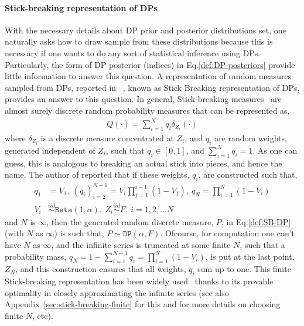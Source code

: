 \documentclass[10pt]{article}
\newcommand{\DP}{\texttt{DP}}
\begin{document}
\paragraph{Stick-breaking representation of DPs} With the necessary details about DP prior and posterior distributions set, one naturally asks how to draw sample from these distributions because this is necessary if one wants to do any sort of statistical inference using DPs. Particularly, the form of DP posterior (indices) in Eq.\ref{def:DP-posteriors} provide little information to answer this question. A representation of random measures sampled from DPs, reported in ~\citep{sethuraman1994constructive}, known as Stick Breaking representation of DPs, provides an answer to this question. 
In general, Stick-breaking measures~\citep{ishwaran2001gibbs} are almost surely discrete random probability measures that can be represented as,
\begin{align}\label{def:Stick-Breaking-priors}
{Q}(\cdot) = \sum_{i=1}^{N}q_{i}\delta_{Z_{i}}(\cdot)
\end{align}
where $\delta_{Z_{i}}$ is a discrete measure concentrated at $Z_{i}$, and $q_{i}$  are random weights, generated independent of $Z_{i}$, such that $q_{i}\in [0,1]$, and $\sum_{i=1}^{N}q_{i} = 1$. As one can guess, this is analogous to breaking an actual stick into pieces, and hence the name. The author of \cite{sethuraman1994constructive} reported  that if these weights, $q_{i}$, are constructed  such that,
\begin{align} 
\label{def:SB-DP}
q_{1}&= V_{1}, \: (q_{i})_{i=2}^{N-1}= V_{i}\prod_{j=1}^{i-1}(1-V_{j}), \: q_{N}= \prod_{i=1}^{N}(1-V_{i})\\ \label{def:SB-DP-3}
V_{i}& \stackrel{iid}{\sim}\texttt{Beta}(1,\alpha), \: Z_{i} \stackrel{iid}{\sim} F,\: i=1,2,...N
\end{align} 
and $N$ is $\infty$, then the generated random discrete measure, $P$, in Eq.\ref{def:SB-DP} (with $N$ as $\infty$) is such that, $P \sim \DP(\alpha,F)$. Ofcourse, for computation one can't have $N$ as $\infty$, and the infinite series is truncated at some finite $N$, such that a probability mass, $q_{N} = 1 - \sum_{i=1}^{N-1} q_{i} = \prod_{i=1}^{N}(1-V_{i})$, is put at the last point, $Z_{N}$, and this construction ensures that all weights, $q_{i}$ sum up to one.  This finite Stick-breaking representation has been widely used~\citep{ishwaran2001gibbs,muliere1998approximating} thanks to its provable optimality in closely approximating the infinite series (see also Appendix~\ref{sec:stick-breaking-finite} for this and for more details on choosing finite $N$, etc).
\end{document}
